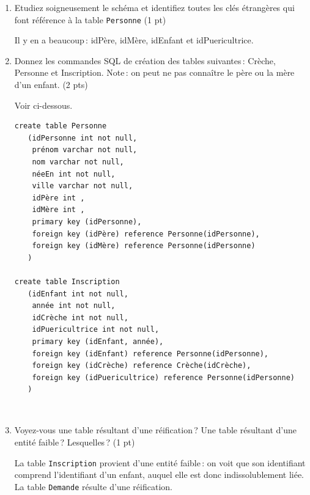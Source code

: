 \begin{enumerate}
  \item Etudiez soigneusement le schéma et identifiez toutes les clés étrangères
      qui font référence à la table \texttt{Personne} (1 pt)
     
     
\begin{solution}
Il y en a beaucoup\,: idPère, idMère, idEnfant et idPuericultrice.
\end{solution}
 
  \item Donnez les commandes SQL de création des tables suivantes\,: 
  Crèche, Personne et Inscription. Note\,: on peut ne pas connaître
  le père ou la mère d'un enfant. (2 pts)
  
\begin{solution}
Voir ci-dessous.

\smallskip


\begin{small}
\begin{verbatim}
create table Personne 
   (idPersonne int not null,
    prénom varchar not null,
    nom varchar not null,
    néeEn int not null,
    ville varchar not null,
    idPère int ,
    idMère int ,
    primary key (idPersonne),
    foreign key (idPère) reference Personne(idPersonne),
    foreign key (idMère) reference Personne(idPersonne)
   )

create table Inscription 
   (idEnfant int not null,
    année int not null,
    idCrèche int not null,
    idPuericultrice int not null,
    primary key (idEnfant, année),
    foreign key (idEnfant) reference Personne(idPersonne),
    foreign key (idCrèche) reference Crèche(idCrèche),
    foreign key (idPuericultrice) reference Personne(idPersonne)
   )
\end{verbatim}
\
\end{small}
\end{solution}
  
  \item Voyez-vous une table résultant d'une réification\,? Une table résultant d'une entité faible\,? 
     Lesquelles\,? (1 pt)
  
     
\begin{solution}
   La table \texttt{Inscription} provient d'une entité faible\,: on voit que son
   identifiant comprend l'identifiant d'un enfant, auquel elle est donc indissolublement liée.
   La table \texttt{Demande} résulte d'une réification.
\end{solution}


\end{enumerate}
